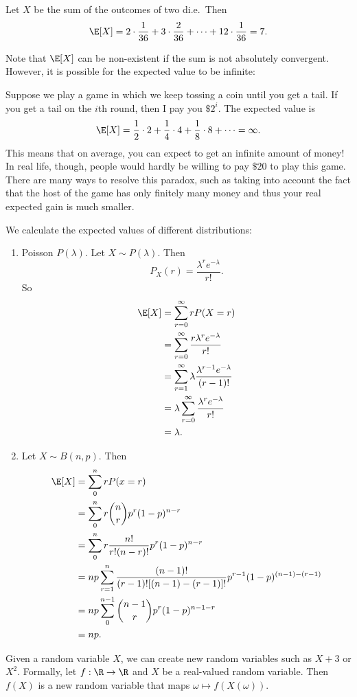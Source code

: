\documentclass[a4paper]{article}
\begin{document}
\begin{eg}
  Let $X$ be the sum of the outcomes of two di.e.\ Then
  \[
    \E[X] = 2\cdot \frac{1}{36} + 3\cdot \frac{2}{36} + \cdots + 12\cdot \frac{1}{36} = 7.
  \]
\end{eg}
Note that $\E[X]$ can be non-existent if the sum is not absolutely convergent. However, it is possible for the expected value to be infinite:

\begin{eg}
  Suppose we play a game in which we keep tossing a coin until you get a tail. If you get a tail on the $i$th round, then I pay you $\$2^i$. The expected value is
  \[
    \E[X] = \frac{1}{2}\cdot 2 + \frac{1}{4}\cdot 4 + \frac{1}{8}\cdot 8 + \cdots = \infty.
  \]
  This means that on average, you can expect to get an infinite amount of money! In real life, though, people would hardly be willing to pay $\$20$ to play this game. There are many ways to resolve this paradox, such as taking into account the fact that the host of the game has only finitely many money and thus your real expected gain is much smaller.
\end{eg}

\begin{eg}
  We calculate the expected values of different distributions:
  \begin{enumerate}
    \item Poisson $P(\lambda)$. Let $X\sim P(\lambda)$. Then
      \[
        P_X(r) = \frac{\lambda^r e^{-\lambda}}{r!}.
      \]
      So
      \begin{align*}
        \E[X] &= \sum_{r = 0}^\infty rP(X = r)\\
        &= \sum_{r = 0}^\infty \frac{r \lambda^r e^{-\lambda}}{r!}\\
        &= \sum_{r = 1}^\infty \lambda \frac{\lambda^{r - 1}e^{-\lambda}}{(r - 1)!}\\
        &= \lambda\sum_{r = 0}^\infty\frac{\lambda^r e^{-\lambda}}{r!}\\
        &= \lambda.
      \end{align*}
    \item Let $X\sim B(n, p)$. Then
      \begin{align*}
        \E[X] &= \sum_0^n rP(x = r)\\
        &= \sum_0^n r\binom{n}{r} p^r(1 - p)^{n - r}\\
        &= \sum_0^n r\frac{n!}{r!(n - r)!}p^r (1 - p)^{n - r}\\
        &= np\sum_{r = 1}^n \frac{(n - 1)!}{(r - 1)![(n - 1) - (r - 1)]!}p^{r - 1}(1 - p)^{(n - 1) - (r - 1)}\\
        &= np\sum_{0}^{n - 1}\binom{n - 1}{r}p^r(1 - p)^{n - 1 - r}\\
        &= np.
      \end{align*}
  \end{enumerate}
\end{eg}
Given a random variable $X$, we can create new random variables such as $X + 3$ or $X^2$. Formally, let $f: \R \to \R$ and $X$ be a real-valued random variable. Then $f(X)$ is a new random variable that maps $\omega \mapsto f(X(\omega))$.
\end{document}
